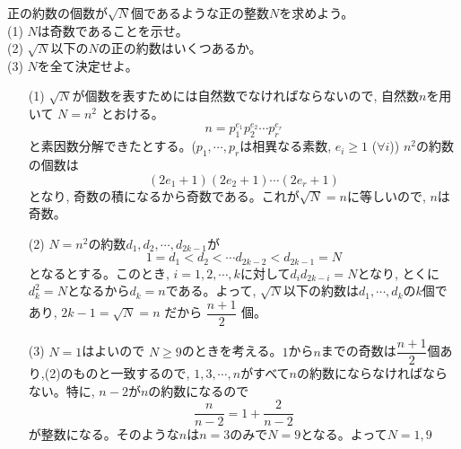 正の約数の個数が$\sqrt{N}$個であるような正の整数$N$を求めよう。\\
(1) $N$は奇数であることを示せ。\\
(2) $\sqrt{N}$以下の$N$の正の約数はいくつあるか。\\
(3) $N$を全て決定せよ。
\enthm
\begin{enumerate}
\item[(1)] $\sqrt{N}$が個数を表すためには自然数でなければならないので,  自然数$n$を用いて $N=n^2$ とおける。
\[n=p_1^{e_1}p_2^{e_2}\cdots p_r^{e_r}\]
と素因数分解できたとする。($p_1, \cdots, p_r$は相異なる素数, $e_i\geq 1$ ($\forall i$)) $n^2$の約数の個数は
\[(2e_1+1)(2e_2+1)\cdots (2e_r +1)\]
となり, 奇数の積になるから奇数である。これが$\sqrt{N}=n$に等しいので, $n$は奇数。
\item[(2)] $N=n^2$の約数$d_1,d_2,\cdots, d_{2k-1}$が
\[1=d_1<d_2<\cdots d_{2k-2}<d_{2k-1}=N\]
となるとする。このとき, $i=1,2,\cdots ,k$に対して$d_id_{2k-i}=N$となり, とくに$d_k^2=N$となるから$d_k=n$である。よって, $\sqrt{N}$以下の約数は$d_1,\cdots, d_k$の$k$個であり, $2k-1=\sqrt{N}=n$ だから $\dfrac{n+1}{2}$ 個。
\item[(3)] $N=1$はよいので $N\geq 9$のときを考える。$1$から$n$までの奇数は$\dfrac{n+1}{2}$個あり,(2)のものと一致するので, $1,3,\cdots, n$がすべて$n$の約数にならなければならない。特に, $n-2$が$n$の約数になるので
\[\dfrac{n}{n-2}=1+\dfrac{2}{n-2}\]
が整数になる。そのような$n$は$n=3$のみで$N=9$となる。よって$N=1,9$
\end{enumerate}
